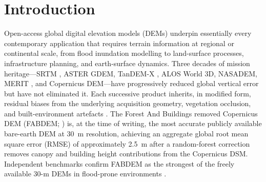 \documentclass[preprint,authoryear,number]{elsarticle}
\begin{document}

\section{Introduction}
\label{sec:introduction}

Open-access global digital elevation models (DEMs) underpin essentially every contemporary application that requires terrain information at regional or continental scale, from flood inundation modelling \citep{Wing2024GlobalFlood,Hawker2024Vietnam} to land-surface processes, infrastructure planning, and earth-surface dynamics. Three decades of mission heritage---SRTM \citep{Farr2007SRTM}, ASTER GDEM, TanDEM-X \citep{Rizzoli2017TanDEMX}, ALOS World 3D, NASADEM, MERIT \citep{Yamazaki2017MERIT}, and Copernicus DEM---have progressively reduced global vertical error but have not eliminated it. Each successive product inherits, in modified form, residual biases from the underlying acquisition geometry, vegetation occlusion, and built-environment artefacts \citep{Schumann2018DEMSurvey,Hawker2018Accuracy}. The Forest And Buildings removed Copernicus DEM (FABDEM; \citealt{Hawker2022FABDEM}) is, at the time of writing, the most accurate publicly available bare-earth DEM at \SI{30}{\meter} resolution, achieving an aggregate global root mean square error (RMSE) of approximately \SI{2.5}{\meter} after a random-forest correction removes canopy and building height contributions from the Copernicus DSM. Independent benchmarks confirm FABDEM as the strongest of the freely available 30-m DEMs in flood-prone environments \citep{Meadows2024VerticalAccuracy}.
\end{document}
